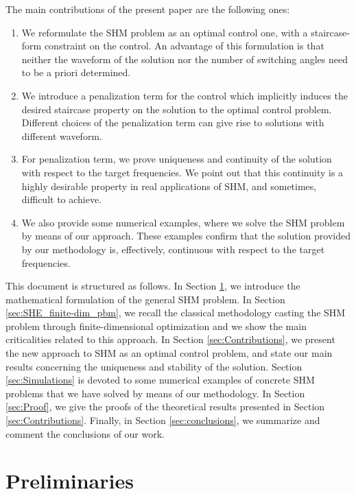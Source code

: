 \documentclass[twocolumn]{autart}    %
\begin{document}
The main contributions of the present paper are the following ones:
\begin{enumerate}
	\item[1.] We reformulate the SHM problem as an optimal control one, with a staircase-form constraint on the control. An advantage of this formulation is that neither the waveform of the solution nor the number of switching angles need to be a priori determined.  
	\item[2.] We introduce a penalization term for the control which implicitly induces the desired staircase property on the solution to the optimal control problem. Different choices of the penalization term can give rise to solutions with different waveform.
	\item[3.] For penalization term, we prove uniqueness and continuity of the solution with respect to the target frequencies. We point out that this continuity is a highly desirable property in real applications of SHM, and sometimes, difficult to achieve.
	\item[4.] We also provide some numerical examples, where we solve the SHM problem by means of our approach. These examples confirm that the solution provided by our methodology is, effectively, continuous with respect to the target frequencies.
\end{enumerate}

This document is structured as follows. In Section \ref{sec:math_formulation}, we introduce the mathematical formulation of the general SHM problem. 
In Section \ref{sec:SHE_finite-dim_pbm}, we recall the classical methodology casting the SHM problem through finite-dimensional optimization and we show the main criticalities related to this approach. In Section \ref{sec:Contributions}, we present the new approach to SHM  as an optimal control problem, and state our main results concerning the uniqueness and stability of the solution. Section \ref{sec:Simulations} is devoted to some numerical examples of concrete SHM problems that we have solved by means of our methodology. In Section \ref{sec:Proof}, we give the proofs of the theoretical results presented in Section \ref{sec:Contributions}. Finally, in Section \ref{sec:conclusions}, we summarize and comment the conclusions of our work.

\section{Preliminaries}\label{sec:math_formulation}
\end{document}
